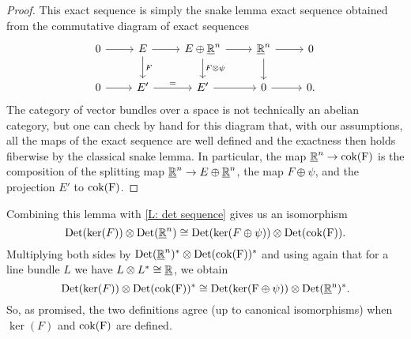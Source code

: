 \begin{proof}
	This exact sequence is simply the snake lemma exact sequence obtained from the commutative diagram of exact sequences
	\[
	\begin{tikzcd}
		0 \arrow[r] & E  \arrow[r] \arrow[d, "F"] & E \oplus \underline{\R}^n \arrow[r] \arrow[d, "F \otimes \psi"] & \underline{\R}^n \arrow[r] \arrow[d] & 0 \\
		0 \arrow[r] & E' \arrow[r, "="] & E' \arrow[r] & 0 \arrow[r] & 0.
	\end{tikzcd}
	\]
	The category of vector bundles over a space is not technically an abelian category, but one can check by hand for this diagram that, with our assumptions, all the maps of the exact sequence are well defined and the exactness then holds fiberwise by the classical snake lemma.
	In particular, the map $\underline{\mathbb{R}}^n \to \rm cok(F)$ is the composition of the splitting map $\underline{\mathbb{R}}^n \to E \oplus \underline{\mathbb{R}}^n$, the map $F \oplus \psi$, and the projection $E'$ to $\rm cok(F)$.
\end{proof}

Combining this lemma with \cref{L: det sequence} gives us an isomorphism
$${\rm Det}(\ker(F)) \otimes {\rm Det}(\underline{\mathbb{R}}^n) \cong {\rm Det}(\ker(F \oplus \psi)) \otimes {\rm Det}(\rm cok(F)).$$
Multiplying both sides by ${\rm Det}(\underline{\mathbb{R}}^n)^* \otimes {\rm Det}(\rm cok(F))^*$ and using again that for a line bundle $L$ we have $L \otimes L^* \cong \underline{\mathbb{R}}$, we obtain
$${\rm Det}(\ker(F)) \otimes {\rm Det}(\rm cok(F))^* \cong {\rm Det}(\ker(F \oplus \psi)) \otimes {\rm Det}(\underline{\mathbb{R}}^n)^*.$$
So, as promised, the two definitions agree (up to canonical isomorphisms) when $\ker(F)$ and $\rm cok(F)$ are defined.

